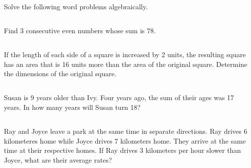 


\section{} Solve the following word problems algebraically.

\subsection{} Find 3 consecutive even numbers whose sum is 78.

\subsection{} If the length of each side of a square is increased by 2 units, the
	resulting square has an area that is 16 units more than the area of the original
	square. Determine the dimensions of the original square.

\subsection{} Susan is 9 years older than Ivy. Four years ago, the sum of their ages
	was 17 years. In how many years will Susan turn 18?

\subsection{} Ray and Joyce leave a park at the same time in separate directions. Ray
	drives 6 kilometeres home while Joyce drives 7 kilometers home. They arrive at the
	same time at their respective homes. If Ray drives 3 kilometers per hour slower
	than Joyce, what are their average rates?

